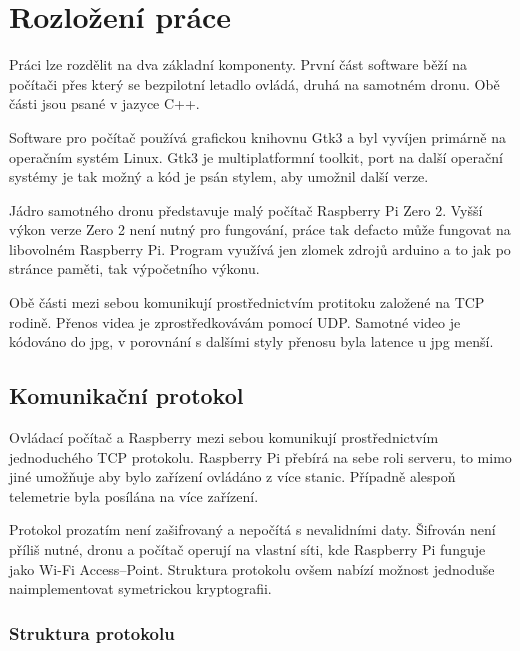 \documentclass[a4paper,oneside,12pt]{report}
\begin{document}


\tableofcontents


\newpage



\setcounter{page}{1}

\chapter{Rozložení práce}

Práci lze rozdělit na dva základní komponenty.
První část software běží na počítači přes který se bezpilotní letadlo ovládá, druhá na samotném dronu.
Obě části jsou psané v jazyce C++.

Software pro počítač používá grafickou knihovnu Gtk3 a byl vyvíjen primárně na operačním systém Linux.
Gtk3 je multiplatformní toolkit, port na další operační systémy je tak možný a kód je psán stylem, aby umožnil další verze.

Jádro samotného dronu představuje malý počítač Raspberry Pi Zero 2.
Vyšší výkon verze Zero 2 není nutný pro fungování, práce tak defacto může fungovat na libovolném Raspberry Pi.
Program využívá jen zlomek zdrojů arduino a to jak po stránce paměti, tak výpočetního výkonu.

Obě části mezi sebou komunikují prostřednictvím protitoku založené na TCP rodině.
Přenos videa je zprostředkovávám pomocí UDP.
Samotné video je kódováno do jpg, v porovnání s dalšími styly přenosu byla latence u jpg menší.

\section{Komunikační protokol}

Ovládací počítač a Raspberry mezi sebou komunikují prostřednictvím jednoduchého TCP protokolu.
Raspberry Pi přebírá na sebe roli serveru, to mimo jiné umožňuje aby bylo zařízení ovládáno z více stanic.
Případně alespoň telemetrie byla posílána na více zařízení.

Protokol prozatím není zašifrovaný a nepočítá s nevalidními daty.
Šifrován není příliš nutné, dronu a počítač operují na vlastní síti, kde Raspberry Pi funguje jako Wi-Fi Access--Point.
Struktura protokolu ovšem nabízí možnost jednoduše naimplementovat symetrickou kryptografii.

\subsection{Struktura protokolu}
\end{document}
